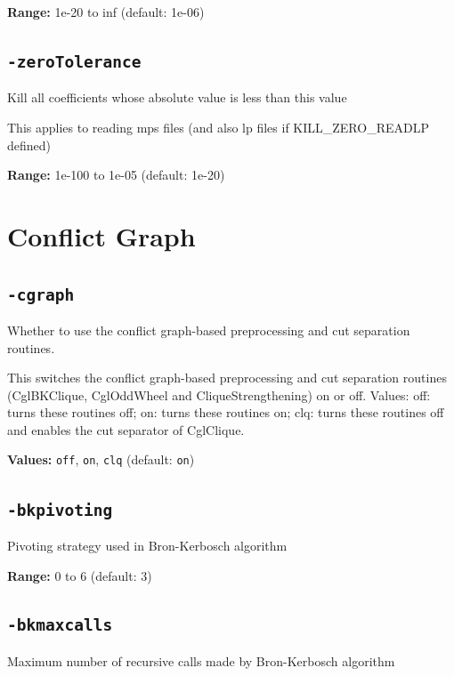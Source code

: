 \documentclass[11pt,a4paper]{article}
\begin{document}
\textbf{Range:} 1e-20 to inf (default: 1e-06)

\subsection*{\texttt{-zeroTolerance}}

Kill all coefficients whose absolute value is less than this value

This applies to reading mps files (and also lp files if KILL\_ZERO\_READLP defined)

\textbf{Range:} 1e-100 to 1e-05 (default: 1e-20)

\section{Conflict Graph}

\subsection*{\texttt{-cgraph}}

Whether to use the conflict graph-based preprocessing and cut separation routines.

This switches the conflict graph-based preprocessing and cut separation routines (CglBKClique, CglOddWheel and CliqueStrengthening) on or off. Values: 
	 off: turns these routines off;
	 on: turns these routines on; 
	 clq: turns these routines off and enables the cut separator of CglClique.

\textbf{Values:} \texttt{off}, \texttt{on}, \texttt{clq} (default: \texttt{on})

\subsection*{\texttt{-bkpivoting}}

Pivoting strategy used in Bron-Kerbosch algorithm

\textbf{Range:} 0 to 6 (default: 3)

\subsection*{\texttt{-bkmaxcalls}}

Maximum number of recursive calls made by Bron-Kerbosch algorithm
\end{document}
